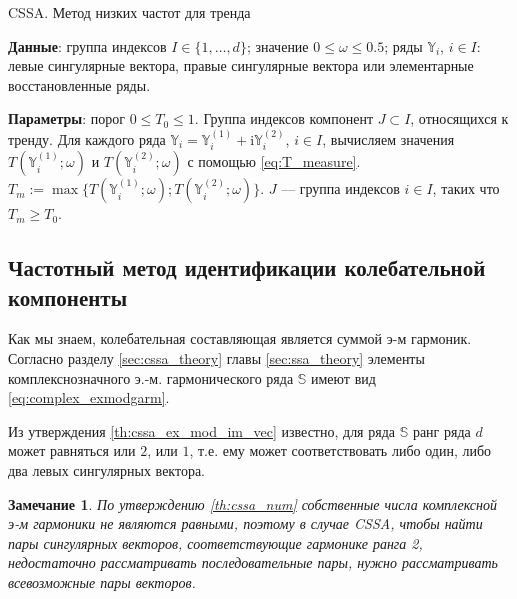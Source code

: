 \documentclass[specialist,
               substylefile = spbu.rtx,
               subf,href,colorlinks=true, 12pt]{disser}
\newcommand{\I}{\mathrm{i}}
\newtheorem{remark}{Замечание}
\begin{document}
\begin{algorithm}[!hhh]
\caption{CSSA. Метод низких частот для тренда}
\label{alg:freqcssa}
\begin{algorithmic}[1]
\REQUIRE 
\item \textbf{Данные}: группа индексов $I \in \{1,\ldots,d\}$; значение  $0 \leqslant  \omega \leqslant 0.5$; ряды $\mathbb{Y}_i$, $i \in I$: левые сингулярные вектора,
правые сингулярные вектора или элементарные восстановленные ряды.
\item \textbf{Параметры}: порог $0 \leqslant T_0 \leqslant 1$.
\ENSURE Группа индексов компонент $J \subset I$, относящихся к тренду.
\STATE  Для каждого ряда $\mathbb{Y}_i = \mathbb{Y}^{(1)}_i + \I \mathbb{Y}^{(2)}_i $, $i \in I$, вычисляем значения $T(\mathbb{Y}^{(1)}_i; \omega)$ и $T(\mathbb{Y}^{(2)}_i; \omega)$ с помощью \eqref{eq:T_measure}. $T_m := \max \{T(\mathbb{Y}^{(1)}_i; \omega); T(\mathbb{Y}^{(2)}_i; \omega)\}$.
\STATE $J$ --- группа индексов $i \in I$, таких что $T_m \geqslant T_0$.
\end{algorithmic}
\end{algorithm}

\subsection{Частотный метод идентификации колебательной компоненты}
Как мы знаем, колебательная составляющая является суммой э-м гармоник.
Согласно разделу \ref{sec:cssa_theory} главы \ref{sec:ssa_theory} элементы комплекснозначного э.-м. гармонического ряда $\mathbb{S}$ имеют вид \eqref{eq:complex_exmodgarm}.

Из утверждения \ref{th:cssa_ex_mod_im_vec} известно, для ряда $\mathbb{S}$ ранг ряда $d$ может равняться или $2$, или $1$, т.е. ему может соответствовать либо один, либо два левых сингулярных вектора. 

\begin{remark}
По утверждению \ref{th:cssa_num} собственные числа комплексной э-м гармоники не являются равными, поэтому в случае CSSA, чтобы найти пары сингулярных векторов, соответствующие гармонике ранга 2, недостаточно рассматривать последовательные пары, нужно рассматривать всевозможные пары векторов.
\end{remark}
\end{document}
